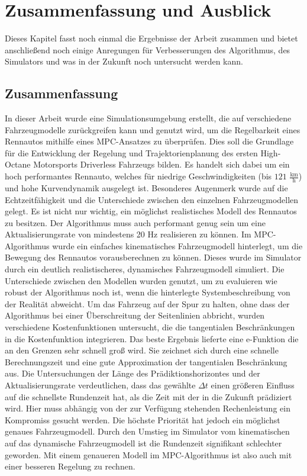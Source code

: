 \documentclass{like}
\begin{document}
\chapter[Zusammenfassung]{Zusammenfassung und Ausblick}
Dieses Kapitel fasst noch einmal die Ergebnisse der Arbeit zusammen und bietet an\-schlie\-ßend noch einige Anregungen für Verbesserungen des Algorithmus, des Simulators und was in der Zukunft noch untersucht werden kann.
\section{Zusammenfassung}
In dieser Arbeit wurde eine Simulationsumgebung erstellt, die auf verschiedene Fahr\-zeug\-mo\-delle zurückgreifen kann und genutzt wird, um die Regelbarkeit eines Rennautos mithilfe eines \ac{MPC}-Ansatzes zu überprüfen. Dies soll die Grundlage für die Entwicklung der Regelung und Trajektorienplanung des ersten High-Octane Motorsports Driverless Fahrzeugs bilden. Es handelt sich dabei um ein hoch performantes Rennauto, welches für niedrige Ge\-schwin\-dig\-kei\-ten (bis $121$ $\frac{\text{km}}{\text{h}}$) und hohe Kurvendynamik ausgelegt ist. Besonderes Augenmerk wurde auf die Echtzeitfähigkeit und die Unterschiede zwischen den einzelnen Fahrzeugmodellen gelegt. Es ist nicht nur wichtig, ein möglichst realistisches Modell des Rennautos zu besitzen. Der Algorithmus muss auch performant genug sein um eine Aktualisierungsrate von mindestens 20 Hz realisieren zu können. 
Im \ac{MPC}-Algorithmus wurde ein einfaches kinematisches Fahrzeugmodell hinterlegt, um die Be\-we\-gung des Rennautos vorausberechnen zu können. Dieses wurde im Simulator durch ein deutlich realistischeres, dynamisches Fahrzeugmodell simuliert. Die Unterschiede zwischen den Modellen wurden genutzt, um zu evaluieren wie robust der Algorithmus noch ist, wenn die hinterlegte Systembeschreibung von der Realität abweicht. Um das Fahrzeug auf der Spur zu halten, ohne dass der Algorithmus bei einer Überschreitung der Seitenlinien abbricht, wurden verschiedene Kostenfunktionen untersucht, die die tangentialen Beschränkungen in die Kostenfunktion integrieren. Das beste Ergebnis lieferte eine e-Funktion die an den Grenzen sehr schnell groß wird. Sie zeichnet sich durch eine schnelle Berechnungszeit und eine gute Approximation der tangentialen Beschränkung aus. Die Untersuchungen der Länge des Prädiktionshorizontes und der Aktualisierungsrate verdeutlichen, dass das gewählte $\Delta t$ einen größeren Einfluss auf die schnellste Rundenzeit hat, als die Zeit mit der in die Zukunft prädiziert wird. Hier muss abhängig von der zur Verfügung stehenden Rechenleistung ein Kompromiss gesucht werden. Die höchste Priorität hat jedoch ein möglichst genaues Fahrzeugmodell. Durch den Umstieg im Simulator vom kinematischen auf das dynamische Fahrzeugmodell ist die Rundenzeit signifikant schlechter geworden. Mit einem genaueren Modell im \ac{MPC}-Algorithmus ist also auch mit einer besseren Regelung zu rechnen.  
\end{document}
